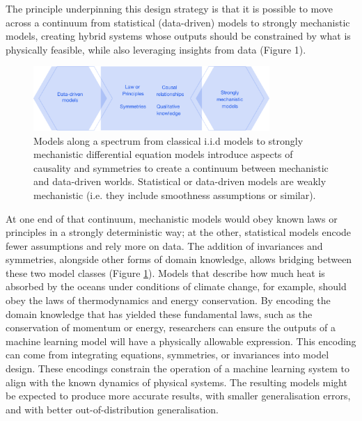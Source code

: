 The principle underpinning this design strategy is that it is possible
to move across a continuum from statistical (data-driven) models to
strongly mechanistic models, creating hybrid systems whose outputs
should be constrained by what is physically feasible, while also
leveraging insights from data (Figure 1).

\begin{figure}
\begin{center}
\includegraphics[width=0.8\textwidth]{media/figure-1.pdf}
\end{center}
\caption{Models along a spectrum from classical i.i.d models to strongly mechanistic differential equation models introduce aspects of causality and symmetries to create a continuum between mechanistic and data-driven worlds. Statistical or data-driven models are weakly mechanistic (i.e. they include smoothness assumptions or similar).}
\label{model-spectrum}
\end{figure}

At one end of that continuum, mechanistic models would obey known laws
or principles in a strongly deterministic way; at the other, statistical
models encode fewer assumptions and rely more on data. The addition of
invariances and symmetries, alongside other forms of domain knowledge,
allows bridging between these two model classes (Figure \ref{model-spectrum}). Models that
describe how much heat is absorbed by the oceans under conditions of
climate change, for example, should obey the laws of thermodynamics and
energy conservation. By encoding the domain knowledge that has yielded
these fundamental laws, such as the conservation of momentum or energy,
researchers can ensure the outputs of a machine learning model will have
a physically allowable expression. This encoding can come from
integrating equations, symmetries, or invariances into model design.
These encodings constrain the operation of a machine learning system to
align with the known dynamics of physical systems. The resulting models
might be expected to produce more accurate results, with smaller
generalisation errors, and with better out-of-distribution
generalisation.

